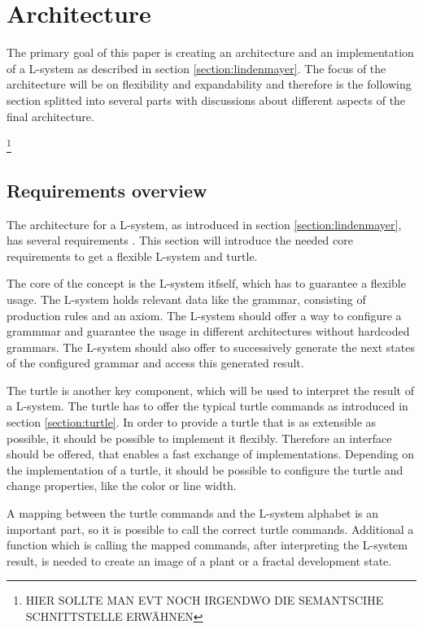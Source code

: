 \documentclass[english]{cpp-hmwk}
\begin{document}
\clearpage
\section{Architecture}
The primary goal of this paper is creating an architecture and an implementation of a L-system as described in section \ref{section:lindenmayer}. The focus of the architecture will be on flexibility and expandability and therefore is the following section splitted into several parts with discussions about different aspects of the final architecture.

\footnote{HIER SOLLTE MAN EVT NOCH IRGENDWO DIE SEMANTSCIHE SCHNITTSTELLE ERWÄHNEN}

\subsection{Requirements overview}
The architecture for a L-system, as introduced in section \ref{section:lindenmayer}, has several requirements . This section will introduce the needed core requirements to get a flexible L-system and turtle.

\medskip
\noindent The core of the concept is the L-system itfself, which has to guarantee a flexible usage. The L-system holds relevant data like the grammar, consisting of production rules and an axiom. The L-system should offer a way to configure a grammmar and guarantee the usage in different architectures without hardcoded grammars. The L-system should also offer to successively generate the next states of the configured grammar and access this generated result.

\medskip

\noindent The turtle is another key component, which will be used to interpret the result of a L-system. The turtle has to offer the typical turtle commands as introduced in section \ref{section:turtle}. In order to provide a turtle that is as extensible as possible, it should be possible to implement it flexibly. Therefore an interface should be offered, that enables a fast exchange of implementations. Depending on the implementation of a turtle, it should be possible to configure the turtle and change properties, like the color or line width.

\medskip
\noindent A mapping between the turtle commands and the L-system alphabet is an important part, so it is possible to call the correct turtle commands. Additional a function which is calling the mapped commands, after interpreting the L-system result, is needed to create an image of a plant or a fractal development state.
\end{document}
